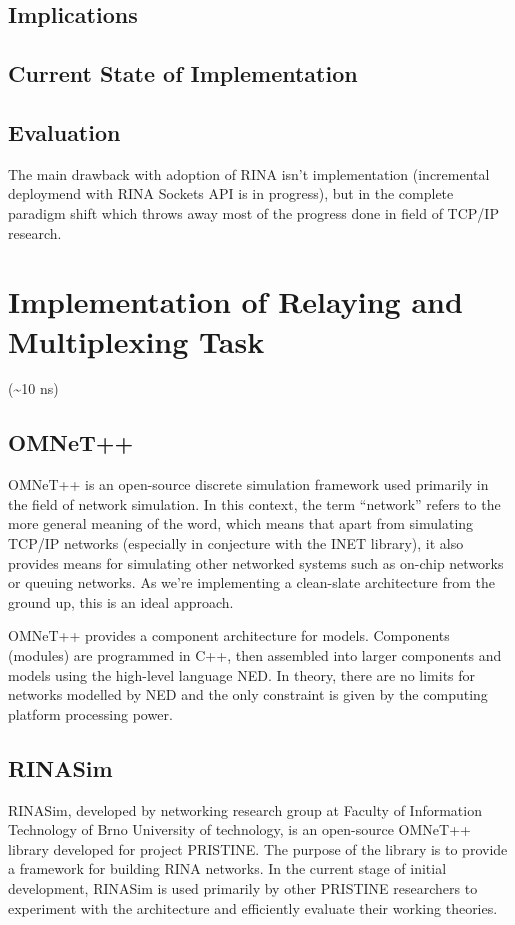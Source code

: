     \section{Implications}


    \section{Current State of Implementation}
    \section{Evaluation}

        The main drawback with adoption of RINA isn't implementation (incremental deploymend with RINA Sockets API is in progress), but in the complete paradigm shift which throws away most of the progress done in field of TCP/IP research.


\chapter{Implementation of Relaying and Multiplexing Task}
    (\textasciitilde10 ns)
    \section{OMNeT++}
        OMNeT++ is an open-source discrete simulation framework used primarily in the field of network simulation. In this context, the term ``network'' refers to the more general meaning of the word, which means that apart from simulating TCP/IP networks (especially in conjecture with the INET library), it also provides means for simulating other networked systems such as on-chip networks or queuing networks. As we're implementing a clean-slate architecture from the ground up, this is an ideal approach.

        OMNeT++ provides a component architecture for models. Components (modules) are programmed in C++, then assembled into larger components and models using the high-level language NED. In theory, there are no limits for networks modelled by NED and the only constraint is given by the computing platform processing power.

    \section{RINASim}
        RINASim, developed by networking research group at Faculty of Information Technology of Brno University of technology, is an open-source OMNeT++ library developed for project PRISTINE. The purpose of the library is to provide a framework for building RINA networks. In the current stage of initial development, RINASim is used primarily by other PRISTINE researchers to experiment with the architecture and efficiently evaluate their working theories.

